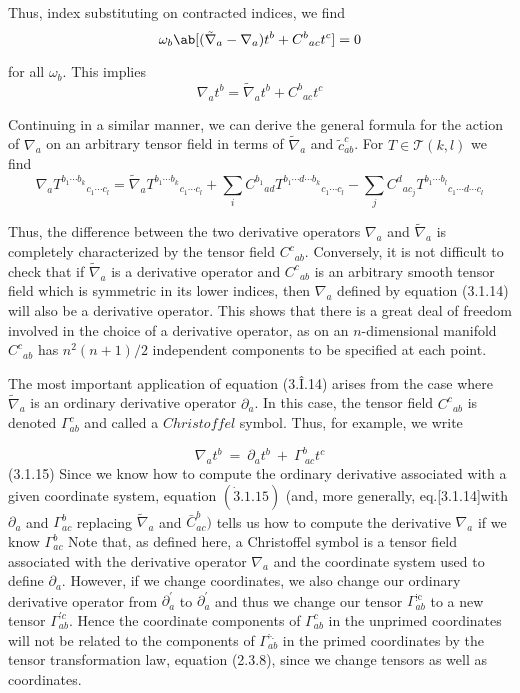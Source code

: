 Thus, index substituting on contracted indices, we find
\begin{equation}
    \omega_{b}\ab[(\tilde{\nabla}_a-\nabla_a)t^{b}+{C^{b}}_{ac}t^c]=0
    \label{3.1.12}
\end{equation}

for all $\omega_b$. This implies
\begin{equation}
    \nabla_at^{b}=\tilde{\nabla}_at^b+{C^{b}}_{ac}t^c
    \label{3.1.13}
\end{equation}

Continuing in a similar manner, we can derive the general formula for the action of $\nabla_a$ on an arbitrary tensor field in terms of $\tilde{\nabla} _a$ and $\tilde{c} _{ab}^c$. For $T\in\mathscr{T}(k,l)$ we find
\begin{equation}
    \nabla_a{T^{b_1\cdots b_k}}_{c_1\cdots c_l}=\tilde{\nabla}_a{T^{b_1\cdots b_k}}_{c_1\cdots c_l}+\sum_iC^{b_1}{}_{ad}T^{b_1\cdots d\cdots b_k}{}_{c_1\cdots c_l}-\sum_jC^d{}_{ac_j}T^{b_1\cdots b_l}{}_{c_1\cdots d\cdots c_l}
    \label{3.1.14}
\end{equation}

Thus, the difference between the two derivative operators $\nabla_a$ and $\tilde{\nabla}_a$ is completely characterized by the tensor field ${C^c}_{ab}.$ Conversely, it is not difficult to check that if $\tilde{\nabla}_a$ is a derivative operator and ${C^c}_{ab}$ is an arbitrary smooth tensor field which is symmetric in its lower indices, then $\nabla_{a}$ defined by equation (3.1.14) will also be a derivative operator. This shows that there is a great deal of freedom involved in the choice of a derivative operator, as on an $n$-dimensional manifold ${C^c}_{ab}$ has $n^2(n+1)/2$ independent components to be specified at each point.

The most important application of equation (3.Î.14) arises from the case where $\tilde{\nabla}_{a}$
is an ordinary derivative operator $\partial_{a}$. In this case, the tensor field ${C^c}_{ab}$ is denoted $\Gamma_{ab}^{c}$ and called a $Christoffel$ symbol. Thus, for example, we write

$$
\nabla_{a}t^{b}\:=\:\partial_{a}t^{b}\:+\:\Gamma_{\:ac}^{b}t^{c}
$$
(3.1.15) Since we know how to compute the ordinary derivative associated with a given coordinate system, equation $(\dot{3}.1.15)$ (and, more generally, eq.[3.1.14]with $\partial_{a}$ and $\Gamma_{ac}^b$ replacing $\tilde{\nabla}_a$ and $\bar{C}_{ac}^b)$ tells us how to compute the derivative $\nabla_a$ if we know $\Gamma_{ac}^b$ Note that, as defined here, a Christoffel symbol is a tensor field associated with the derivative operator $\nabla_a$ and the coordinate system used to define $\partial_a$. However, if we change coordinates, we also change our ordinary derivative operator from $\partial_a^{\prime}$ to $\partial_a^{\prime}$ and thus we change our tensor $\Gamma_{ab}^\mathrm{\vdots c}$ to a new tensor $\Gamma_{ab}^{\prime c}$. Hence the coordinate components of $\Gamma_{ab}^c$ in the unprimed coordinates will not be related to the components of $\Gamma_{ab}^{\ddots}$ in the primed coordinates by the tensor transformation law, equation (2.3.8), since we change tensors as well as coordinates.

